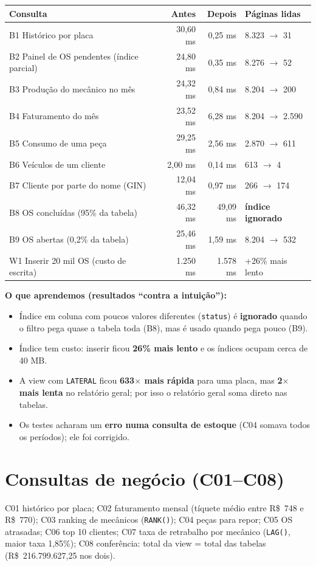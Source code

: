 \documentclass[a4paper,11pt]{article}
\newcommand{\cod}[1]{\texttt{\small #1}}
\begin{document}
\begin{longtable}{p{5.4cm}rrp{4.1cm}}
\hline
\textbf{Consulta} & \textbf{Antes} & \textbf{Depois} & \textbf{Páginas lidas} \\ \hline
B1 Histórico por placa & 30,60 ms & 0,25 ms & 8.323 $\rightarrow$ 31 \\
B2 Painel de OS pendentes (índice parcial) & 24,80 ms & 0,35 ms & 8.276 $\rightarrow$ 52 \\
B3 Produção do mecânico no mês & 24,32 ms & 0,84 ms & 8.204 $\rightarrow$ 200 \\
B4 Faturamento do mês & 23,52 ms & 6,28 ms & 8.204 $\rightarrow$ 2.590 \\
B5 Consumo de uma peça & 29,25 ms & 2,56 ms & 2.870 $\rightarrow$ 611 \\
B6 Veículos de um cliente & 2,00 ms & 0,14 ms & 613 $\rightarrow$ 4 \\
B7 Cliente por parte do nome (GIN) & 12,04 ms & 0,97 ms & 266 $\rightarrow$ 174 \\
B8 OS concluídas (95\% da tabela) & 46,32 ms & 49,09 ms & \textbf{índice ignorado} \\
B9 OS abertas (0,2\% da tabela) & 25,46 ms & 1,59 ms & 8.204 $\rightarrow$ 532 \\
W1 Inserir 20 mil OS (custo de escrita) & 1.250 ms & 1.578 ms & +26\% mais lento \\ \hline
\end{longtable}

\textbf{O que aprendemos (resultados ``contra a intuição''):}
\begin{itemize}
  \item Índice em coluna com poucos valores diferentes (\cod{status}) é
  \textbf{ignorado} quando o filtro pega quase a tabela toda (B8), mas é usado quando pega pouco (B9).
  \item Índice tem custo: inserir ficou \textbf{26\% mais lento} e os índices ocupam cerca de 40 MB.
  \item A view com \cod{LATERAL} ficou \textbf{633$\times$ mais rápida} para uma placa,
  mas \textbf{2$\times$ mais lenta} no relatório geral; por isso o relatório geral soma direto nas tabelas.
  \item Os testes acharam um \textbf{erro numa consulta de estoque} (C04 somava todos os
  períodos); ele foi corrigido.
\end{itemize}

\section{Consultas de negócio (C01--C08)}
C01 histórico por placa; C02 faturamento mensal (tíquete médio entre R\$~748 e R\$~770);
C03 ranking de mecânicos (\cod{RANK()}); C04 peças para repor; C05 OS atrasadas;
C06 top 10 clientes; C07 taxa de retrabalho por mecânico (\cod{LAG()}, maior taxa 1,85\%);
C08 conferência: total da view = total das tabelas (R\$~216.799.627,25 nos dois).
\end{document}
